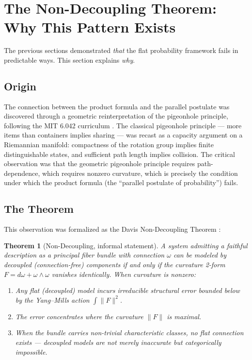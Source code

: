 \documentclass[12pt]{article}
\newtheorem{theorem}{Theorem}
\begin{document}
\section{The Non-Decoupling Theorem: Why This Pattern Exists}

The previous sections demonstrated \textit{that} the flat probability framework fails in predictable ways. This section explains \textit{why}.

\subsection{Origin}

The connection between the product formula and the parallel postulate was discovered through a geometric reinterpretation of the pigeonhole principle, following the MIT 6.042 curriculum \cite{moitra2024}. The classical pigeonhole principle --- more items than containers implies sharing --- was recast as a capacity argument on a Riemannian manifold: compactness of the rotation group implies finite distinguishable states, and sufficient path length implies collision. The critical observation was that the geometric pigeonhole principle requires path-dependence, which requires nonzero curvature, which is precisely the condition under which the product formula (the ``parallel postulate of probability'') fails.

\subsection{The Theorem}

This observation was formalized as the Davis Non-Decoupling Theorem \cite{davis2026nondecoupling}:

\begin{theorem}[Non-Decoupling, informal statement]
A system admitting a faithful description as a principal fiber bundle with connection $\omega$ can be modeled by decoupled (connection-free) components if and only if the curvature 2-form $F = d\omega + \omega \wedge \omega$ vanishes identically. When curvature is nonzero:
\begin{enumerate}[nosep]
\item Any flat (decoupled) model incurs irreducible structural error bounded below by the Yang--Mills action $\int \|F\|^2$.
\item The error concentrates where the curvature $\|F\|$ is maximal.
\item When the bundle carries non-trivial characteristic classes, no flat connection exists --- decoupled models are not merely inaccurate but categorically impossible.
\end{enumerate}
\end{theorem}
\end{document}
